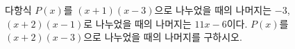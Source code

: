다항식 $P(x)$를 $(x+1)(x-3)$으로 나누었을 때의 나머지는 $-3$, $(x+2)(x-1)$로 나누었을 때의 나머지는 $11x-6$이다. $P(x)$를 $(x+2)(x-3)$으로 나누었을 때의 나머지를 구하시오.
